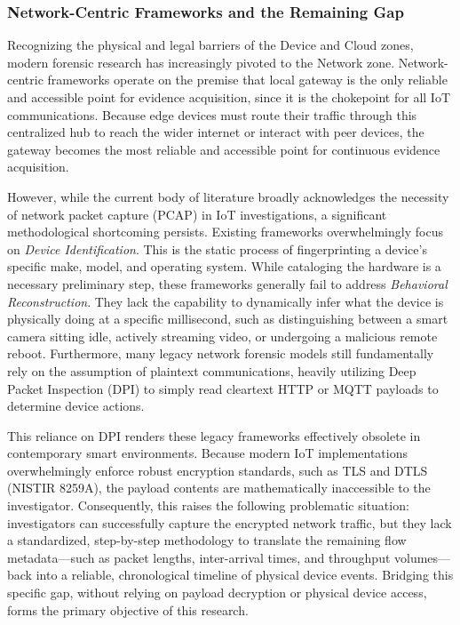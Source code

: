 \subsubsection{Network-Centric Frameworks and the Remaining Gap}
Recognizing the physical and legal barriers of the Device and Cloud zones, modern forensic research has increasingly pivoted to the Network zone. Network-centric frameworks operate on the premise that local gateway is the only reliable and accessible point for evidence acquisition, since it is the chokepoint for all IoT communications. Because edge devices must route their traffic through this centralized hub to reach the wider internet or interact with peer devices, the gateway becomes the most reliable and accessible point for continuous evidence acquisition.

However, while the current body of literature broadly acknowledges the necessity of network packet capture (PCAP) in IoT investigations, a significant methodological shortcoming persists. Existing frameworks overwhelmingly focus on \textit{Device Identification}. This is the static process of fingerprinting a device's specific make, model, and operating system. While cataloging the hardware is a necessary preliminary step, these frameworks generally fail to address \textit{Behavioral Reconstruction}. They lack the capability to dynamically infer what the device is physically doing at a specific millisecond, such as distinguishing between a smart camera sitting idle, actively streaming video, or undergoing a malicious remote reboot. Furthermore, many legacy network forensic models still fundamentally rely on the assumption of plaintext communications, heavily utilizing Deep Packet Inspection (DPI) to simply read cleartext HTTP or MQTT payloads to determine device actions.

This reliance on DPI renders these legacy frameworks effectively obsolete in contemporary smart environments. Because modern IoT implementations overwhelmingly enforce robust encryption standards, such as TLS and DTLS (NISTIR 8259A), the payload contents are mathematically inaccessible to the investigator. Consequently, this raises the following problematic situation: investigators can successfully capture the encrypted network traffic, but they lack a standardized, step-by-step methodology to translate the remaining flow metadata—such as packet lengths, inter-arrival times, and throughput volumes—back into a reliable, chronological timeline of physical device events. Bridging this specific gap, without relying on payload decryption or physical device access, forms the primary objective of this research.

